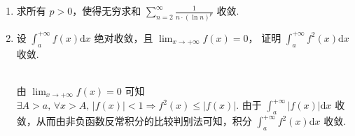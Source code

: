 \begin{enumerate}
\begin{enumerate}
    \end{enumerate}
    \item[2.]求所有 \(p > 0\)，使得无穷求和 \(\displaystyle\sum_{n = 2}^{\infty}\frac{1}{n\cdot(\ln n)^p}\) 收敛.
    \item[3.]设 \(\displaystyle\int_{a}^{+\infty}f(x)\mathrm{d}x\) 绝对收敛，且 \(\displaystyle\lim_{x\to +\infty}f(x) = 0\)，
    证明 \(\displaystyle\int_{a}^{+\infty}f^{2}(x)\mathrm{d}x\) 收敛.
    \begin{solution}\\
        由 $\displaystyle \lim_{x \to +\infty}f(x)=0$ 可知 $\displaystyle\exists A>a,\,\forall x>A,\,\left|f(x)\right|<1\Rightarrow f^2(x)\leq\left|f(x)\right|$.
        由于 $\displaystyle\int_{a}^{+\infty}\left|f(x)\right|\mathrm{d}x$ 收敛，从而由非负函数反常积分的比较判别法可知，积分 $\displaystyle\int_{a}^{+\infty}f^2(x)\mathrm{d}x$ 收敛.
    \end{solution}


\end{enumerate}
